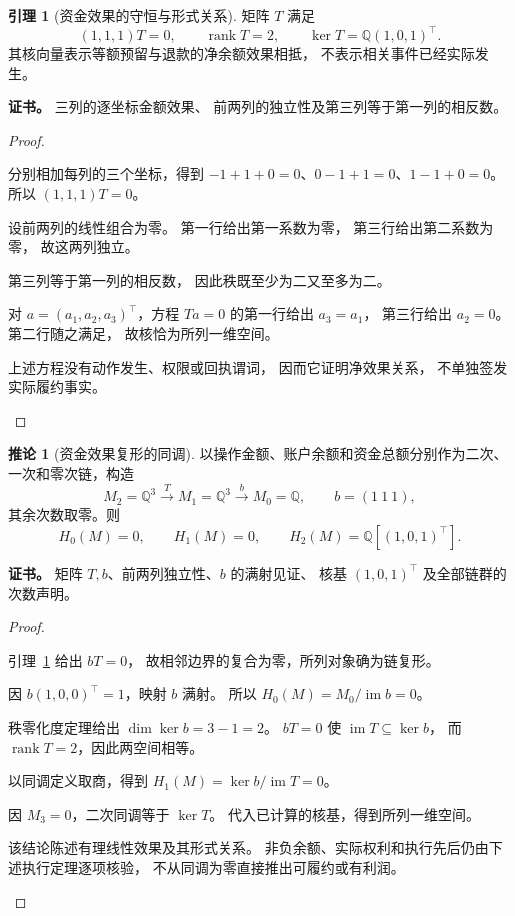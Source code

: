 \documentclass[UTF8,12pt,a4paper,openany,fontset=none,zihao=false]{ctexrep}
\theoremstyle{definition}
\newtheorem{lemma}{引理}[chapter]
\newtheorem{corollary}{推论}[chapter]
\newenvironment{certificate}{\par\noindent\textbf{证书。}\ignorespaces}{\par}
\newcommand{\1}{\mathbf 1}
\begin{document}
\begin{lemma}[资金效果的守恒与形式关系]
\label{std:money-kernel}
矩阵 \(T\) 满足
\[
(1,1,1)T=0,\qquad
\operatorname{rank}T=2,\qquad
\ker T=\mathbb Q(1,0,1)^\top.
\]
其核向量表示等额预留与退款的净余额效果相抵，
不表示相关事件已经实际发生。
\end{lemma}
\begin{certificate}
三列的逐坐标金额效果、
前两列的独立性及第三列等于第一列的相反数。
\end{certificate}
\begin{proof}
\begin{semanticsteps}
\item 分别相加每列的三个坐标，得到
\(-1+1+0=0\)、\(0-1+1=0\)、\(1-1+0=0\)。
所以 \((1,1,1)T=0\)。
\item 设前两列的线性组合为零。
第一行给出第一系数为零，
第三行给出第二系数为零，
故这两列独立。
\item 第三列等于第一列的相反数，
因此秩既至少为二又至多为二。
\item 对 \(a=(a_1,a_2,a_3)^\top\)，方程 \(Ta=0\)
的第一行给出 \(a_3=a_1\)，
第三行给出 \(a_2=0\)。
第二行随之满足，
故核恰为所列一维空间。
\item 上述方程没有动作发生、权限或回执谓词，
因而它证明净效果关系，
不单独签发实际履约事实。
\end{semanticsteps}
\end{proof}

\begin{corollary}[资金效果复形的同调]
\label{std:money-homology}
以操作金额、账户余额和资金总额分别作为二次、一次和零次链，构造
\[
M_2=\mathbb Q^3\xrightarrow{\ T\ }M_1=\mathbb Q^3
\xrightarrow{\ b\ }M_0=\mathbb Q,
\qquad b=(1\ 1\ 1),
\]
其余次数取零。则
\[
H_0(M)=0,\qquad H_1(M)=0,\qquad
H_2(M)=\mathbb Q[(1,0,1)^\top].
\]
\end{corollary}
\begin{certificate}
矩阵 \(T,b\)、前两列独立性、\(b\) 的满射见证、
核基 \((1,0,1)^\top\) 及全部链群的次数声明。
\end{certificate}
\begin{proof}
\begin{semanticsteps}
\item 引理~\ref{std:money-kernel} 给出 \(bT=0\)，
故相邻边界的复合为零，所列对象确为链复形。
\item 因 \(b(1,0,0)^\top=1\)，映射 \(b\) 满射。
所以 \(H_0(M)=M_0/\operatorname{im}b=0\)。
\item 秩零化度定理给出 \(\dim\ker b=3-1=2\)。
\(bT=0\) 使 \(\operatorname{im}T\subseteq\ker b\)，
而 \(\operatorname{rank}T=2\)，因此两空间相等。
\item 以同调定义取商，得到
\(H_1(M)=\ker b/\operatorname{im}T=0\)。
\item 因 \(M_3=0\)，二次同调等于 \(\ker T\)。
代入已计算的核基，得到所列一维空间。
\item 该结论陈述有理线性效果及其形式关系。
非负余额、实际权利和执行先后仍由下述执行定理逐项核验，
不从同调为零直接推出可履约或有利润。
\end{semanticsteps}
\end{proof}
\end{document}
